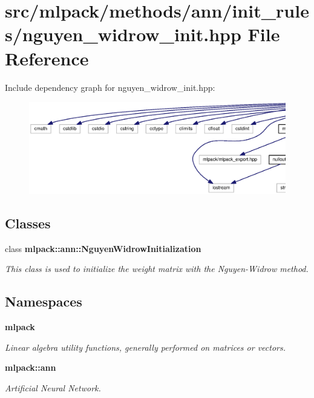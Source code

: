 \section{src/mlpack/methods/ann/init\+\_\+rules/nguyen\+\_\+widrow\+\_\+init.hpp File Reference}
\label{nguyen__widrow__init_8hpp}
Include dependency graph for nguyen\+\_\+widrow\+\_\+init.\+hpp\+:
\nopagebreak
\begin{figure}[H]
\begin{center}
\leavevmode
\includegraphics[width=350pt]{nguyen__widrow__init_8hpp__incl}
\end{center}
\end{figure}
\subsection*{Classes}
\begin{DoxyCompactItemize}
\item 
class {\bf mlpack\+::ann\+::\+Nguyen\+Widrow\+Initialization}
\begin{DoxyCompactList}\small\item\em This class is used to initialize the weight matrix with the Nguyen-\/\+Widrow method. \end{DoxyCompactList}\end{DoxyCompactItemize}
\subsection*{Namespaces}
\begin{DoxyCompactItemize}
\item 
 {\bf mlpack}
\begin{DoxyCompactList}\small\item\em Linear algebra utility functions, generally performed on matrices or vectors. \end{DoxyCompactList}\item 
 {\bf mlpack\+::ann}
\begin{DoxyCompactList}\small\item\em Artificial Neural Network. \end{DoxyCompactList}\end{DoxyCompactItemize}


